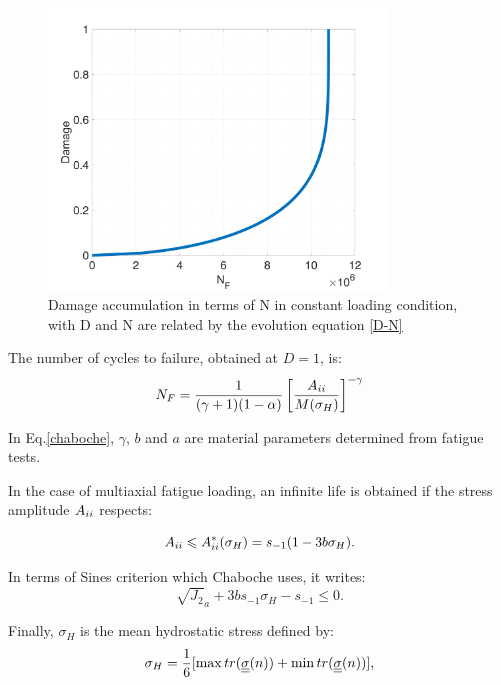 \begin{figure}[h!]
	\centering
	\includegraphics[width=0.8\textwidth]{figures//D-N.png} 
	\caption{Damage accumulation in terms of N in constant loading condition, with D and N are related by the evolution equation \eqref{D-N}}
	\label{DN}
\end{figure}

The number of cycles to failure, obtained at $D=1$, is: 
\begin{equation}N_F = \frac{1}{(\gamma+1)(1-\alpha)}\left[\frac{A_{\uppercase\expandafter{\romannumeral2}}}{M(\sigma_H)}\right]^{-\gamma}
\label{chaboche}
\end{equation} 

In Eq.\eqref{chaboche}, $\gamma$, $b$ and $a$ are material parameters determined from fatigue tests.

In the case of multiaxial fatigue loading, an infinite life is obtained if the stress amplitude $A_{\uppercase\expandafter{\romannumeral2}}$ respects:

\begin{equation}A_{\uppercase\expandafter{\romannumeral2}}\leqslant A_{\uppercase\expandafter{\romannumeral2}}^\ast(\sigma_H)=s_{-1}(1-3b\sigma_H).\end{equation}

In terms of Sines criterion which Chaboche uses, it writes:
\begin{equation}\sqrt{J_2}_a+3bs_{-1}\sigma_H-s_{-1}\leqslant 0.
\label{sines}
\end{equation}

Finally, $\sigma_H$ is the mean hydrostatic stress defined by:
\begin{equation}\sigma_H=\frac{1}{6}[\max tr(\uline{\uline{\sigma}}(n))+\min tr(\uline{\uline{\sigma}}(n))],\end{equation}


